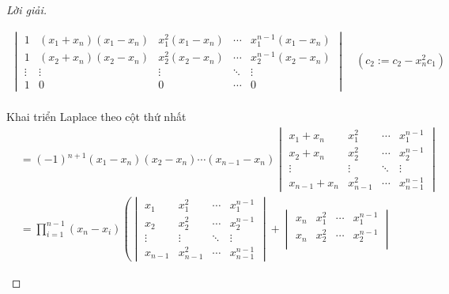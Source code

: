 \documentclass[class=nhvh-linear-algebra,crop=false]{standalone}
\begin{document}
\begin{proof}[Lời giải]
\begin{enumerate}[label = (\alph*)]
\begin{align*}
\begin{vmatrix}
                      1      & (x_{1} + x_{n})(x_{1} - x_{n}) & x_{1}^{2}(x_{1} - x_{n}) & \cdots & x_{1}^{n-1}(x_{1} - x_{n}) \\
                      1      & (x_{2} + x_{n})(x_{2} - x_{n}) & x_{2}^{2}(x_{2} - x_{n}) & \cdots & x_{2}^{n-1}(x_{2} - x_{n}) \\
                      \vdots & \vdots                         & \vdots                   & \ddots & \vdots                     \\
                      1      & 0                              & 0                        & \cdots & 0
                  \end{vmatrix}\quad(c_{2}:=c_{2} - x_{n}^{2}c_{1}) \\
              \end{align*}
              \par Khai triển Laplace theo cột thứ nhất
              \begin{align*}
                   & = (-1){}^{n+1}(x_{1} - x_{n})(x_{2} - x_{n})\cdots (x_{n-1} - x_{n})
                  \begin{vmatrix}
                      x_{1} + x_{n}   & x_{1}^{2}   & \cdots & x_{1}^{n-1}   \\
                      x_{2} + x_{n}   & x_{2}^{2}   & \cdots & x_{2}^{n-1}   \\
                      \vdots          & \vdots      & \ddots & \vdots        \\
                      x_{n-1} + x_{n} & x_{n-1}^{2} & \cdots & x_{n-1}^{n-1}
                  \end{vmatrix}                  \\
                   & = \prod^{n-1}_{i=1}(x_{n} - x_{i})\left(
                  \begin{vmatrix}
                          x_{1}   & x_{1}^{2}   & \cdots & x_{1}^{n-1}   \\
                          x_{2}   & x_{2}^{2}   & \cdots & x_{2}^{n-1}   \\
                          \vdots  & \vdots      & \ddots & \vdots        \\
                          x_{n-1} & x_{n-1}^{2} & \cdots & x_{n-1}^{n-1}
                      \end{vmatrix}
                  +
                  \begin{vmatrix}
                          x_{n}  & x_{1}^{2}   & \cdots & x_{1}^{n-1}   \\
                          x_{n}  & x_{2}^{2}   & \cdots & x_{2}^{n-1}   \\

\end{vmatrix}
\end{align*}
\end{enumerate}
\end{proof}
\end{document}
